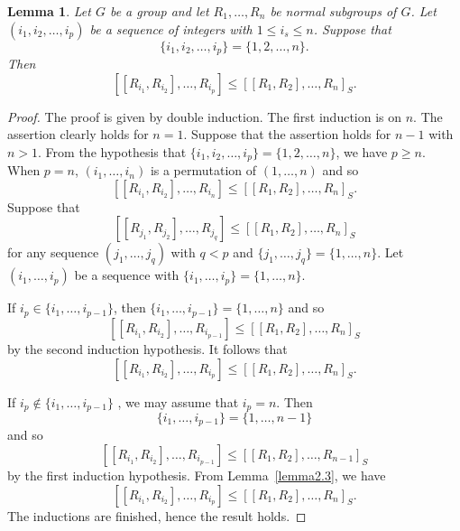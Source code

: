 \documentclass[10pt]{amsart}
\newtheorem{lem}[thm]{Lemma}
\numberwithin{equation}{section}
\begin{document}
\begin{lem}\label{lemma2.4}
Let $G$ be a group and let $R_1,\ldots,R_n$ be normal subgroups of $G$. Let $(i_1,i_2,\ldots,i_p)$ be a sequence of integers with $1\leq i_s\leq n$. Suppose that $$\{i_1,i_2,\ldots,i_p\}=\{1,2,\ldots,n\}.$$ Then
$$
[[R_{i_1},R_{i_2}],\ldots,R_{i_p}]\leq [[R_1,R_2],\ldots,R_n]_S.
$$
\end{lem}
\begin{proof}The proof is given by double induction. The first induction is on  $n$.
 The assertion clearly holds for $n=1$. Suppose that the assertion holds for $n-1$ with $n>1$.
From the hypothesis that $\{i_1,i_2,\ldots,i_p\}=\{1,2,\ldots,n\}$, we have $p\geq n$. When $p=n$, $(i_1,\ldots,i_n)$ is a permutation of $(1,\ldots,n)$ and so $$[[R_{i_1},R_{i_2}],\ldots,R_{i_n}]\leq [[R_1,R_2],\ldots,R_n]_S.$$ Suppose that
$$
[[R_{j_1},R_{j_2}],\ldots,R_{j_q}]\leq [[R_1,R_2],\ldots,R_n]_S
$$
for any sequence $(j_1,\ldots,j_q)$ with $q<p$ and $\{j_1,\ldots,j_q\}=\{1,\ldots,n\}$. Let $(i_1,\ldots,i_p)$ be a sequence with $\{i_1,\ldots,i_p\}=\{1,\ldots,n\}$.

If $i_p\in \{i_1,\ldots,i_{p-1}\}$, then $\{i_1,\ldots,i_{p-1}\}=\{1,\ldots,n\}$ and so
$$
[[R_{i_1},R_{i_2}],\ldots,R_{i_{p-1}}]\leq [[R_1,R_2],\ldots,R_n]_S
$$
by the second induction hypothesis. It follows that
$$
[[R_{i_1},R_{i_2}],\ldots,R_{i_p}]\leq [[R_1,R_2],\ldots,R_n]_S.
$$

If $i_p\not\in \{i_1,\ldots,i_{p-1}\}$ , we may assume that $i_p=n$. Then $$\{i_1,\ldots,i_{p-1}\}=\{1,\ldots,n-1\}$$ and so
$$
[[R_{i_1},R_{i_2}],\ldots,R_{i_{p-1}}]\leq [[R_1,R_2],\ldots,R_{n-1}]_S
$$
by the first induction hypothesis. From Lemma~\ref{lemma2.3}, we have
$$
[[R_{i_1},R_{i_2}],\ldots,R_{i_p}]\leq [[R_1,R_2],\ldots,R_n]_S.
$$
The inductions are  finished, hence the result holds.
\end{proof}
\end{document}
